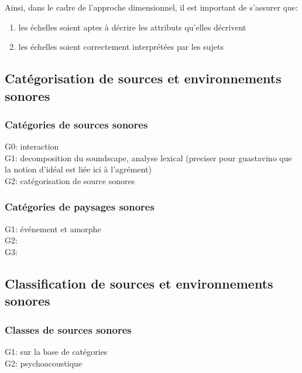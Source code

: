 Ainsi, dans le cadre de l'approche dimensionnel, il est important de s'assurer que:

\begin{enumerate}
\item les échelles soient aptes à décrire les attributs qu'elles décrivent
\item les échelles soient correctement interprétées par les sujets
\end{enumerate}

\subsection{Catégorisation de sources et environnements sonores}

\subsubsection{Catégories de sources sonores}

G0: \citep{gaver1993world} interaction \\
G1: \citep{guastavino2006ideal,szeremeta2009analysis} decomposition du soundscape, analyse lexical (preciser pour guastavino que la notion d'idéal est liée ici à l'agrément) \\
G2: \citep{Houix03f,guastavino2007categorization,gygi2007similarity,houix_lexical_2012} catégorisation de source sonores

\subsubsection{Catégories de paysages sonores}

G1: \citep{maffiolo_caracterisation_1999} événement et amorphe\\
G2: \citep{jeon2013soundwalk}\\
G3: \citep{brown2011towards}

\subsection{Classification de sources et environnements sonores}

\subsubsection{Classes de sources sonores}

G1: \citep{niessen2010categories,park14} sur la base de catégories\\
G2: \citep{yang2013psychoacoustical} psychoacoustique

